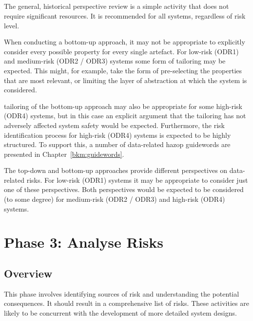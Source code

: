 \subsection{}
The general, historical perspective review is a simple activity that does not require significant resources. It is recommended for all systems, regardless of risk level.

When conducting a bottom-up approach, it may not be appropriate to explicitly consider every possible property for every single artefact. For low-risk (ODR1) and medium-risk (ODR2 / ODR3) systems some form of \gls{tailoring} may be expected. This might, for example, take the form of pre-selecting the properties that are most relevant, or limiting the layer of abstraction at which the system is considered.

\Gls{tailoring} of the bottom-up approach may also be appropriate for some high-risk (ODR4) systems, but in this case an explicit argument that the \gls{tailoring} has not adversely affected system safety would be expected. Furthermore, the risk identification process for high-risk (ODR4) systems is expected to be highly structured. To support this, a number of data-related \gls{hazop} guidewords are presented in Chapter~\ref{bkm:guidewords}.

The top-down and bottom-up approaches provide different perspectives on data-related risks. For low-risk (ODR1) systems it may be appropriate to consider just one of these perspectives. Both perspectives would be expected to be considered (to some degree) for medium-risk (ODR2 / ODR3) and high-risk (ODR4) systems.
\section{Phase 3: Analyse Risks}\label{bkm:analyserisks}
\subsection{Overview}
This phase involves identifying sources of risk and understanding the potential consequences. It should result in a comprehensive list of risks. These activities are likely to be concurrent with the development of more detailed system designs.

